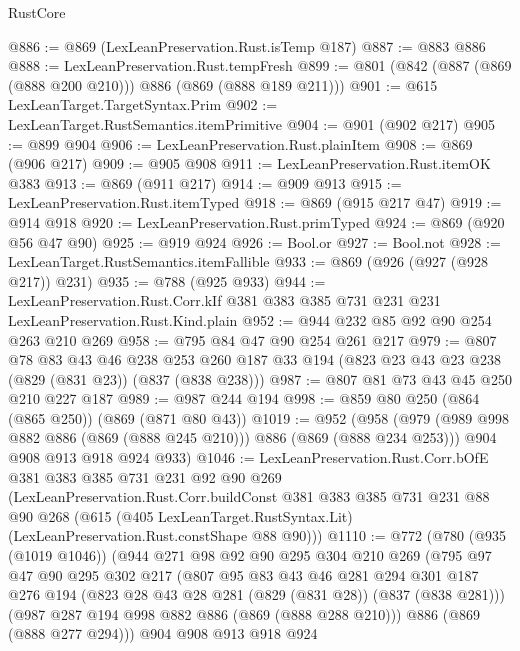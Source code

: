 \begin{lexlean}{RustCore}
\begin{coremodule}
@886 := @869 (LexLeanPreservation.Rust.isTemp @187)
@887 := @883 @886
@888 := LexLeanPreservation.Rust.tempFresh
@899 := @801 (@842 (@887 (@869 (@888 @200 @210))) @886 (@869 (@888 @189 @211)))
@901 := @615 LexLeanTarget.TargetSyntax.Prim
@902 := LexLeanTarget.RustSemantics.itemPrimitive
@904 := @901 (@902 @217)
@905 := @899 @904
@906 := LexLeanPreservation.Rust.plainItem
@908 := @869 (@906 @217)
@909 := @905 @908
@911 := LexLeanPreservation.Rust.itemOK @383
@913 := @869 (@911 @217)
@914 := @909 @913
@915 := LexLeanPreservation.Rust.itemTyped
@918 := @869 (@915 @217 @47)
@919 := @914 @918
@920 := LexLeanPreservation.Rust.primTyped
@924 := @869 (@920 @56 @47 @90)
@925 := @919 @924
@926 := Bool.or
@927 := Bool.not
@928 := LexLeanTarget.RustSemantics.itemFallible
@933 := @869 (@926 (@927 (@928 @217)) @231)
@935 := @788 (@925 @933)
@944 := LexLeanPreservation.Rust.Corr.kIf
    @381
    @383
    @385
    @731
    @231
    @231
    LexLeanPreservation.Rust.Kind.plain
@952 := @944 @232 @85 @92 @90 @254 @263 @210 @269
@958 := @795 @84 @47 @90 @254 @261 @217
@979 := @807
    @78
    @83
    @43
    @46
    @238
    @253
    @260
    @187
    @33
    @194
    (@823 @23 @43 @23 @238 (@829 (@831 @23)) (@837 (@838 @238)))
@987 := @807 @81 @73 @43 @45 @250 @210 @227 @187
@989 := @987 @244 @194
@998 := @859 @80 @250 (@864 (@865 @250)) (@869 (@871 @80 @43))
@1019 := @952
    (@958
      (@979 (@989 @998 @882 @886 (@869 (@888 @245 @210))) @886 (@869 (@888 @234 @253)))
      @904
      @908
      @913
      @918
      @924
      @933)
@1046 := LexLeanPreservation.Rust.Corr.bOfE
    @381
    @383
    @385
    @731
    @231
    @92
    @90
    @269
    (LexLeanPreservation.Rust.Corr.buildConst
      @381
      @383
      @385
      @731
      @231
      @88
      @90
      @268
      (@615 (@405 LexLeanTarget.RustSyntax.Lit) (LexLeanPreservation.Rust.constShape @88 @90)))
@1110 := @772
    (@780
      (@935 (@1019 @1046))
      (@944
        @271
        @98
        @92
        @90
        @295
        @304
        @210
        @269
        (@795
          @97
          @47
          @90
          @295
          @302
          @217
          (@807
            @95
            @83
            @43
            @46
            @281
            @294
            @301
            @187
            @276
            @194
            (@823 @28 @43 @28 @281 (@829 (@831 @28)) (@837 (@838 @281)))
            (@987 @287 @194 @998 @882 @886 (@869 (@888 @288 @210)))
            @886
            (@869 (@888 @277 @294)))
          @904
          @908
          @913
          @918
          @924

\end{coremodule}
\end{lexlean}
